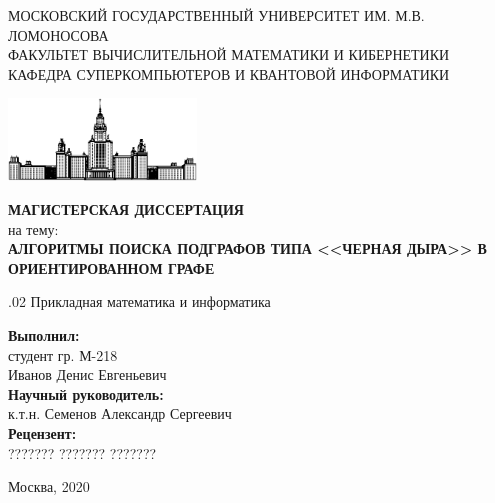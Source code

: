 \documentclass[12pt,a4paper,oneside,openany]{article}
\theoremstyle{definition}
\theoremstyle{lemma}
\theoremstyle{remark}
\begin{document}
\begin{titlepage}
        \begin{center}

        \bigskip

        \MakeTextUppercase{Московский государственный университет им. М.В. Ломоносова} \\

        \MakeTextUppercase{Факультет вычислительной математики и кибернетики} \\
        \MakeTextUppercase{Кафедра суперкомпьютеров и квантовой информатики} \\
        \bigskip

        \includegraphics[width=50mm]{msu.eps}

        \bigskip
        \bigskip
        \MakeTextUppercase{\textbf{\Huge Магистерская диссертация}} \\
        \bigskip
        {\large на тему:} \\
        \bigskip
        \MakeTextUppercase{\textbf{\large Алгоритмы поиска подграфов типа <<черная дыра>> в ориентированном графе}}

        .02 Прикладная математика и информатика

    \end{center}

    \bigskip
    \bigskip
    \bigskip
    \begin{flushright}
        \begin{minipage}{7cm}
            \textbf{Выполнил:} \\
            студент гр. М-218 \\
            Иванов Денис Евгеньевич \\

            \textbf{Научный руководитель:} \\
            к.т.н. Семенов Александр Сергеевич \\

            \textbf{Рецензент:} \\
            ??????? ??????? ???????
        \end{minipage}
    \end{flushright}

    \vfill

    \begin{center}
    {\large Москва, 2020}
    \end{center}

\end{titlepage}
\end{document}
